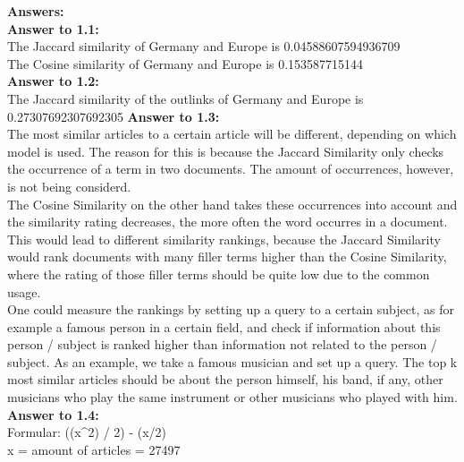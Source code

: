 \documentclass{WeSTassignment}
\begin{document}
\textbf{Answers:}\\
\textbf{Answer to 1.1:} \\
The Jaccard similarity of Germany and Europe is 0.04588607594936709 \\
The Cosine similarity of Germany and Europe is 0.153587715144 \\
\textbf{Answer to 1.2:} \\
The Jaccard similarity of the outlinks of Germany and Europe is 0.27307692307692305
\textbf{Answer to 1.3:} \\
The most similar articles to a certain article will be different, depending on which model is used. The reason for this is because the Jaccard Similarity only checks the occurrence of a term in two documents. The amount of occurrences, however, is not being considerd.\\
The Cosine Similarity on the other hand takes these occurrences into account and the similarity rating decreases, the more often the word occurres in a document.
This would lead to different similarity rankings, because the Jaccard Similarity would rank documents with many filler terms higher than the Cosine Similarity, where the rating of those filler terms should be quite low due to the common usage.\\
One could measure the rankings by setting up a query to a certain subject, as for example a famous person in a certain field, and check if information about this person / subject is ranked higher than information not related to the person / subject. As an example, we take a famous musician and set up a query. The top k most similar articles should be about the person himself, his band, if any, other musicians who play the same instrument or other musicians who played with him. \\
\textbf{Answer to 1.4:} \\
Formular: ((x^2) / 2) - (x/2) \\


x = amount of articles = 27497 
\end{document}
